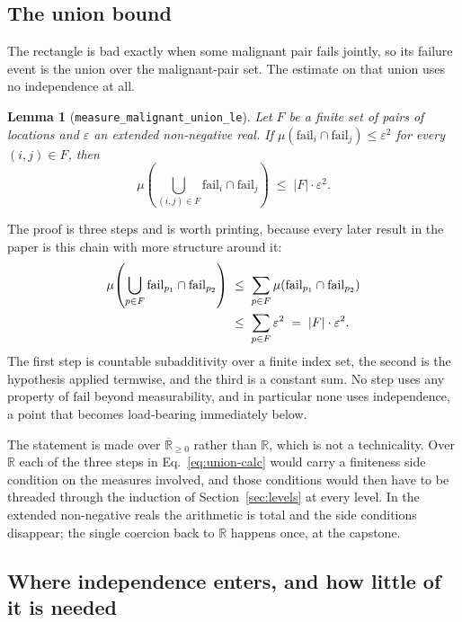 \documentclass[aps,prx,reprint,nofootinbib,superscriptaddress]{revtex4-2}
\newtheorem{lemma}[theorem]{Lemma}
\begin{document}
\subsection{The union bound}

The rectangle is bad exactly when some malignant pair fails jointly, so its
failure event is the union over the malignant-pair set. The estimate on that
union uses no independence at all.

\begin{lemma}[\texttt{measure\_malignant\_union\_le}]
\label{lem:union}
Let $F$ be a finite set of pairs of locations and $\varepsilon$ an extended
non-negative real. If $\mu(\mathrm{fail}_i \cap \mathrm{fail}_j) \le
\varepsilon^2$ for every $(i,j) \in F$, then
\begin{equation}
  \mu\!\left(\bigcup_{(i,j)\in F} \mathrm{fail}_i \cap \mathrm{fail}_j\right)
    \;\le\; |F| \cdot \varepsilon^2.
  \label{eq:union-bound}
\end{equation}
\end{lemma}

The proof is three steps and is worth printing, because every later result in
the paper is this chain with more structure around it:
\begin{align}
  \mu\!\left(\bigcup_{p\in F} \mathrm{fail}_{p_1} \cap \mathrm{fail}_{p_2}\right)
    &\;\le\; \sum_{p \in F} \mu(\mathrm{fail}_{p_1} \cap \mathrm{fail}_{p_2})
      \notag \\
    &\;\le\; \sum_{p \in F} \varepsilon^2
      \;=\; |F| \cdot \varepsilon^2 .
  \label{eq:union-calc}
\end{align}
The first step is countable subadditivity over a finite index set, the second is
the hypothesis applied termwise, and the third is a constant sum. No step uses
any property of $\mathrm{fail}$ beyond measurability, and in particular none uses
independence, a point that becomes load-bearing immediately below.

The statement is made over $\overline{\mathbb{R}}_{\ge 0}$ rather than
$\mathbb{R}$, which is not a technicality. Over $\mathbb{R}$ each of the three
steps in Eq.~\eqref{eq:union-calc} would carry a finiteness side condition on
the measures involved, and those conditions would then have to be threaded
through the induction of Section~\ref{sec:levels} at every level. In the
extended non-negative reals the arithmetic is total and the side conditions
disappear; the single coercion back to $\mathbb{R}$ happens once, at the
capstone.

\subsection{Where independence enters, and how little of it is needed}
\end{document}
